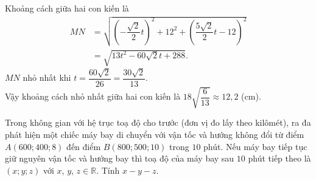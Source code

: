 \begin{bt}
{{
}
\noindent 
Khoảng cách giữa hai con kiến là 
\begin{align*}
MN &= \sqrt{ \left (-\dfrac{\sqrt{2}}{2} t \right )^2+12^2 + \left (\dfrac{5\sqrt{2}}{2}t -12\right )^2 } \\
& = \sqrt{13 t^2-60 \sqrt{2} t+288}.
\end{align*}
$MN$ nhỏ nhất khi $t= \dfrac{60\sqrt{2}}{26} = \dfrac{30\sqrt{2}}{13} $. \\
Vậy khoảng cách nhỏ nhất giữa hai con kiến là $18 \sqrt{\dfrac{6}{13}} \approx 12{,}2$ (cm).
}
\end{bt}

\begin{bt}%
Trong không gian với hệ trục toạ độ cho trước (đơn vị đo lấy theo kilômét), ra đa phát hiện một chiếc máy bay di chuyển với vận tốc và hướng không đổi từ điểm $A(600; 400; 8)$ đến điểm $B(800; 500; 10)$ trong $10$ phút. Nếu máy bay tiếp tục giữ nguyên vận tốc và hướng bay thì toạ độ của máy bay sau $10$ phút tiếp theo là $(x;y;z)$ với $x$, $y$, $z\in \mathbb{R}$. Tính $x-y-z$.
\end{bt}

